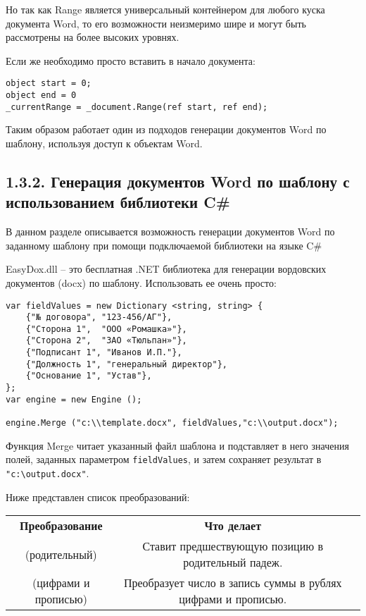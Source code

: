 Но так как Range является универсальный контейнером для любого куска документа Word, то его возможности неизмеримо шире и могут быть рассмотрены на более высоких уровнях.

Если же необходимо просто вставить в начало документа:

\begin{verbatim}
object start = 0;
object end = 0
_currentRange = _document.Range(ref start, ref end);
\end{verbatim}

Таким образом работает один из подходов генерации документов Word по шаблону, используя доступ к объектам Word.



\subsection{1.3.2. Генерация документов Word по шаблону с использованием библиотеки C\#}


В данном разделе описывается возможность генерации документов Word по заданному шаблону при помощи подключаемой библиотеки на языке C\#


EasyDox.dll – это бесплатная .NET библиотека для генерации вордовских документов (docx) по шаблону. Использовать ее очень просто:

\begin{verbatim}
var fieldValues = new Dictionary <string, string> {
    {"№ договора", "123-456/АГ"},
    {"Сторона 1",  "ООО «Ромашка»"},
    {"Сторона 2",  "ЗАО «Тюльпан»"},
    {"Подписант 1", "Иванов И.П."},
    {"Должность 1", "генеральный директор"},
    {"Основание 1", "Устав"},
};
var engine = new Engine ();

engine.Merge ("c:\\template.docx", fieldValues,"c:\\output.docx");
\end{verbatim}

Функция Merge читает указанный файл шаблона и подставляет в него значения полей, заданных параметром \verb|fieldValues|, и затем сохраняет результат в \verb|"c:\output.docx"|.

Ниже представлен список преобразований:

\begin{center}
\begin{tabular}{ccc}
\textbf{Преобразование} & \textbf{Что делает} \\
(родительный) & Ставит предшествующую позицию в родительный падеж. \\
(цифрами и прописью) & Преобразует число в запись суммы в рублях цифрами и прописью. \\

\end{tabular}
\end{center}

